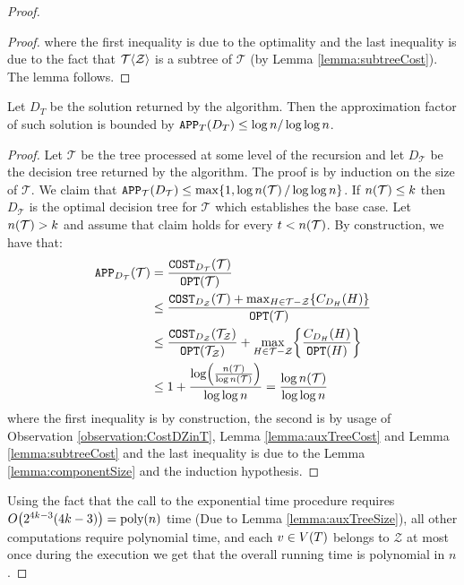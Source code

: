 \begin{theorem}
\begin{proof}
\begin{lemma}
\begin{proof}
        where the first inequality is due to the optimality and the last inequality is due to the fact that $\mathcal{T}\mathopen{}\langle \mathcal{Z} \rangle$ is a subtree of $\mathcal{T}$ (by Lemma \ref{lemma:subtreeCost}). The lemma follows.
    \end{proof}
\end{lemma}
\begin{lemma}
    Let $D_T$ be the solution returned by the algorithm. Then the approximation factor of such solution is bounded by 
    $
    \texttt{APP}_T\mathopen{}\left( D_T \right)\leq \log n/\log\log n
    $.
    \begin{proof}
        Let $\mathcal{T}$ be the tree processed at some level of the recursion and let $D_{\mathcal{T}}$ be the decision tree returned by the algorithm. The proof is by induction on the size of $\mathcal{T}$.  We claim that $\texttt{APP}_{\mathcal{T}}\mathopen{}\left( D_{\mathcal{T}} \right)\leq \max\mathopen{}\left\{ 1, \log n\mathopen{}\left( \mathcal{T} \right)/\log\log n \right\}$. If $n\mathopen{}\left( \mathcal{T} \right)\leq k$ then $D_{\mathcal{T}}$ is the optimal decision tree for $\mathcal{T}$ which establishes the base case. Let $n\mathopen{}\left( \mathcal{T} \right) > k$ and assume that claim holds for every $t< n\mathopen{}\left( \mathcal{T} \right)$. 
        By construction, we have that:
        \begin{align*}
        \texttt{APP}_{D_{\mathcal{T}}}\mathopen{}\left( \mathcal{T} \right)&=\frac{\texttt{COST}_{D_{\mathcal{T}}}\mathopen{}\left( \mathcal{T} \right)}{\texttt{OPT}\mathopen{}\left( \mathcal{T} \right)}\\
        &\leq \frac{\texttt{COST}_{D_{\mathcal{Z}}}\mathopen{}\left( \mathcal{T} \right)+\max_{H\in \mathcal{T}-\mathcal{Z}}\mathopen{}\left\{ C_{D_H}\mathopen{}\left( H \right) \right\}}{\texttt{OPT}\mathopen{}\left( \mathcal{T} \right)}\\
        &\leq 
        \frac{\texttt{COST}_{D_{\mathcal{Z}}}\mathopen{}\left( \mathcal{T}_{\mathcal{Z}} \right)}{\texttt{OPT}\mathopen{}\left( \mathcal{T}_{\mathcal{Z}} \right)}+\max_{H\in \mathcal{T}-\mathcal{Z}}\mathopen{}\left\{ \frac{C_{D_H}\mathopen{}\left( H \right)}{\texttt{OPT}\mathopen{}\left( H \right)} \right\}\\
        &\leq 1+\frac{\log\mathopen{}\left( \frac{n\mathopen{}\left( \mathcal{T} \right)}{\log n\mathopen{}\left( \mathcal{T} \right)} \right)}{\log\log n}= \frac{\log n\mathopen{}\left( \mathcal{T} \right)}{\log\log n}
        \end{align*}
        where the first inequality is by construction, the second is by usage of Observation \ref{observation:CostDZinT}, Lemma \ref{lemma:auxTreeCost} and Lemma \ref{lemma:subtreeCost} and the last inequality is due to the Lemma \ref{lemma:componentSize} and the induction hypothesis.
    \end{proof}
\end{lemma}
    Using the fact that the call to the exponential time procedure requires $O\mathopen{}\left( 2^{4k-3}\mathopen{}\left( 4k-3 \right) \right)=\text{poly}\mathopen{}\left( n \right)$ time (Due to Lemma \ref{lemma:auxTreeSize}), all other computations require polynomial time, and each $v\in V\mathopen{}\left( T \right)$ belongs to $\mathcal{Z}$ at most once during the execution we get that the overall running time is polynomial in $n$.
    \end{proof}
\end{theorem}

